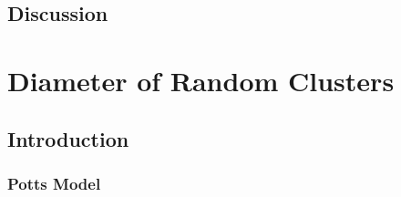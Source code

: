 \documentclass{umthesis}          %
\begin{document}
\section{Discussion}
\label{sec-3.4}

\chapter{Diameter of Random Clusters}
\label{sec-4}

\section{Introduction}
\label{sec-4.1}

\subsection{Potts Model \cite{Wu82}}
\label{sec-4.1.1}
\end{document}
